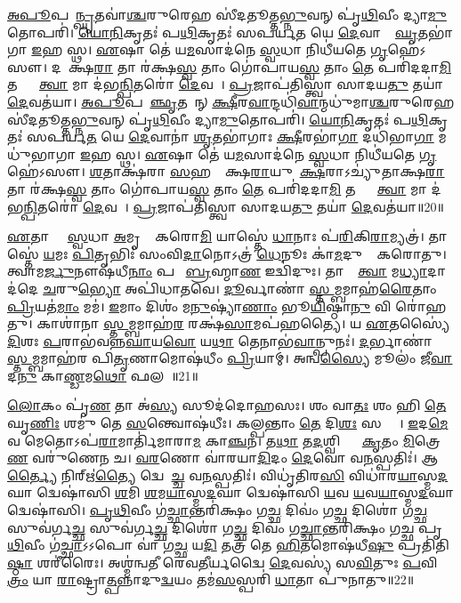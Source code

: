 \ul{𑌅}\ul{𑌪𑍂}𑌪𑌵𑌾᳚\ul{𑌨𑍍𑌘𑍃}𑌤𑌵𑌾॑\ul{𑌶𑍍𑌚}𑌰𑍁𑌰𑍇𑌹 𑌸𑍀॑𑌦𑌤𑍂𑌤𑍍𑌤\ul{𑌭𑍍𑌨𑍁}𑌵𑌨𑍍 𑌪𑍃॑\ul{𑌥𑌿}𑌵𑍀𑌂 𑌦𑍍𑌯𑌾\ul{𑌮𑍁}𑌤𑍋𑌪𑌰𑌿॑। 
\ul{𑌯𑍋}\ul{𑌨𑌿}𑌕𑍃𑌤𑌃॑ 𑌪\ul{𑌥𑌿}𑌕𑍃𑌤𑌃॑ 𑌸𑌪𑌰𑍍𑌯\ul{𑌤} 𑌯𑍇 \ul{𑌦𑍇}𑌵𑌾𑌨𑌾𑌂᳚ \ul{𑌘𑍃}𑌤𑌭𑌾॑𑌗𑌾 \ul{𑌇}𑌹 𑌸𑍍𑌥। 
\ul{𑌏}𑌷𑌾 𑌤𑍇॑ 𑌯\ul{𑌮}𑌸𑌾𑌦॑𑌨𑍇 \ul{𑌸𑍍𑌵}𑌧𑌾 𑌨𑌿𑌧𑍀॑𑌯𑌤𑍇 \ul{𑌗𑍃}𑌹𑍇॑𑌽𑌸𑍗। 
𑌦𑌶𑌾᳚𑌕𑍍𑌷\ul{𑌰𑌾} 𑌤𑌾 𑌰॑𑌕𑍍𑌷\ul{𑌸𑍍𑌵} 𑌤𑌾𑌂 𑌗𑍋॑𑌪𑌾𑌯\ul{𑌸𑍍𑌵} 𑌤𑌾𑌂 \ul{𑌤𑍇} 𑌪𑌰𑌿॑𑌦𑌦𑌾\ul{𑌮𑌿} 𑌤𑌸𑍍𑌯𑌾𑌂᳚ \ul{𑌤𑍍𑌵𑌾} 𑌮𑌾 𑌦॑𑌭\ul{𑌨𑍍𑌪𑌿}𑌤𑌰𑍋॑ \ul{𑌦𑍇}𑌵𑌤𑌾᳚। 
\ul{𑌪𑍍𑌰}𑌜𑌾𑌪॑𑌤𑌿𑌸𑍍𑌤𑍍𑌵𑌾 𑌸𑌾𑌦𑌯\ul{𑌤𑍁} 𑌤𑌯𑌾॑ \ul{𑌦𑍇}𑌵𑌤॑𑌯𑌾। 
\ul{𑌅}\ul{𑌪𑍂}𑌪𑌵𑌾᳚\ul{𑌞𑍍𑌛𑍃}𑌤𑌵𑌾᳚𑌨𑍍 \ul{𑌕𑍍𑌷𑍀}𑌰\ul{𑌵𑌾}𑌨𑍍𑌦𑌧𑌿॑\ul{𑌵𑌾}𑌨𑍍𑌮𑌧𑍁॑𑌮𑌾\ul{𑌶𑍍𑌚}𑌰𑍁𑌰𑍇𑌹 𑌸𑍀॑𑌦𑌤𑍂𑌤𑍍𑌤\ul{𑌭𑍍𑌨𑍁}𑌵𑌨𑍍 𑌪𑍃॑\ul{𑌥𑌿}𑌵𑍀𑌂 𑌦𑍍𑌯𑌾\ul{𑌮𑍁}𑌤𑍋𑌪𑌰𑌿॑। 
\ul{𑌯𑍋}\ul{𑌨𑌿}𑌕𑍃𑌤𑌃॑ 𑌪\ul{𑌥𑌿}𑌕𑍃𑌤𑌃॑ 𑌸𑌪𑌰𑍍𑌯\ul{𑌤} 𑌯𑍇 \ul{𑌦𑍇}𑌵𑌾𑌨𑌾॑ \ul{𑌶𑍃}𑌤𑌭𑌾॑𑌗𑌾𑌃 \ul{𑌕𑍍𑌷𑍀}𑌰𑌭𑌾॑\ul{𑌗𑌾} 𑌦𑌧𑌿॑𑌭𑌾\ul{𑌗𑌾} 𑌮𑌧𑍁॑𑌭𑌾𑌗𑌾 \ul{𑌇}𑌹 𑌸𑍍𑌥। 
\ul{𑌏}𑌷𑌾 𑌤𑍇॑ 𑌯\ul{𑌮}𑌸𑌾𑌦॑𑌨𑍇 \ul{𑌸𑍍𑌵}𑌧𑌾 𑌨𑌿𑌧𑍀॑𑌯𑌤𑍇 \ul{𑌗𑍃}𑌹𑍇॑𑌽𑌸𑍗। 
\ul{𑌶}𑌤𑌾𑌕𑍍𑌷॑𑌰𑌾 \ul{𑌸}𑌹𑌸𑍍𑌰𑌾᳚𑌕𑍍𑌷\ul{𑌰𑌾}𑌯𑍁𑌤𑌾᳚\ul{𑌕𑍍𑌷}𑌰𑌾𑌽𑌚𑍍𑌯𑍁॑𑌤𑌾𑌕𑍍𑌷\ul{𑌰𑌾} 𑌤𑌾 𑌰॑𑌕𑍍𑌷\ul{𑌸𑍍𑌵} 𑌤𑌾𑌂 𑌗𑍋॑𑌪𑌾𑌯\ul{𑌸𑍍𑌵} 𑌤𑌾𑌂 \ul{𑌤𑍇} 𑌪𑌰𑌿॑𑌦𑌦𑌾\ul{𑌮𑌿} 𑌤𑌸𑍍𑌯𑌾𑌂᳚ \ul{𑌤𑍍𑌵𑌾} 𑌮𑌾 𑌦॑𑌭\ul{𑌨𑍍𑌪𑌿}𑌤𑌰𑍋॑ \ul{𑌦𑍇}𑌵𑌤𑌾᳚। 
\ul{𑌪𑍍𑌰}𑌜𑌾𑌪॑𑌤𑌿𑌸𑍍𑌤𑍍𑌵𑌾 𑌸𑌾𑌦𑌯\ul{𑌤𑍁} 𑌤𑌯𑌾॑ \ul{𑌦𑍇}𑌵𑌤॑𑌯𑌾॥20॥
\anuvakamend[𑌅𑌨॑𑌪𑌸𑍍𑌫𑍁𑌰\ul{𑌨𑍍𑌤𑍀}𑌰𑍁𑌤𑍍𑌤॑𑌰 \ul{𑌦𑍇}𑌵𑌤॑\ul{𑌯𑌾} 𑌦𑍍𑌵𑍇 𑌚॑]

\ul{𑌏}𑌤𑌾𑌸𑍍𑌤𑍇᳚ \ul{𑌸𑍍𑌵}𑌧𑌾 \ul{𑌅}𑌮𑍃𑌤𑌾𑌃᳚ 𑌕𑌰𑍋\ul{𑌮𑌿} 𑌯𑌾𑌸𑍍𑌤𑍇॑ \ul{𑌧𑌾}𑌨𑌾𑌃 𑌪॑\ul{𑌰𑌿}𑌕𑌿\ul{𑌰𑌾}𑌮𑍍𑌯𑌤𑍍𑌰॑। 
𑌤𑌾𑌸𑍍𑌤𑍇॑ \ul{𑌯}𑌮𑌃 \ul{𑌪𑌿}𑌤𑍃𑌭𑌿𑌃॑ 𑌸𑌂𑌵𑌿\ul{𑌦𑌾}𑌨𑍋𑌽𑌤𑍍𑌰॑ \ul{𑌧𑍇}𑌨𑍂𑌃 𑌕𑌾॑\ul{𑌮}𑌦𑍁𑌘𑌾𑌃᳚ 𑌕𑌰𑍋𑌤𑍁। 
𑌤𑍍𑌵𑌾𑌮\ul{𑌰𑍍𑌜𑍁}𑌨𑍗𑌷॑𑌧𑍀\ul{𑌨𑌾𑌂} 𑌪𑌯𑍋᳚ \ul{𑌬𑍍𑌰}𑌹𑍍𑌮𑌾\ul{𑌣} 𑌇𑌦𑍍𑌵𑌿॑𑌦𑍁𑌃। 
𑌤𑌾𑌸𑌾𑌂᳚ \ul{𑌤𑍍𑌵𑌾} 𑌮\ul{𑌧𑍍𑌯𑌾}𑌦𑌾𑌦॑𑌦𑍇 \ul{𑌚}𑌰𑍁\ul{𑌭𑍍𑌯𑍋} 𑌅𑌪𑌿॑𑌧𑌾𑌤𑌵𑍇। 
\ul{𑌦𑍂}𑌰𑍍𑌵𑌾𑌣𑌾॑ \ul{𑌸𑍍𑌤}𑌮𑍍𑌬𑌮𑌾𑌹॑\ul{𑌰𑍈}𑌤𑌾𑌂 \ul{𑌪𑍍𑌰𑌿}𑌯𑌤॑\ul{𑌮𑌾𑌂} 𑌮𑌮॑। 
\ul{𑌇}𑌮𑌾𑌂 𑌦𑌿𑌶𑌂॑ 𑌮\ul{𑌨𑍁}𑌷𑍍𑌯𑌾॑\ul{𑌣𑌾𑌂} 𑌭𑍂\ul{𑌯𑌿}𑌷𑍍𑌠𑌾\ul{𑌨𑍁} 𑌵𑌿 𑌰𑍋॑𑌹𑌤𑍁। 
𑌕𑌾𑌶𑌾॑𑌨𑌾 \ul{𑌸𑍍𑌤}𑌮𑍍𑌬𑌮𑌾𑌹॑\ul{𑌰} 𑌰𑌕𑍍𑌷॑\ul{𑌸𑌾}𑌮𑌪॑𑌹𑌤𑍍𑌯𑍈। 
𑌯 \ul{𑌏}𑌤𑌸𑍍𑌯𑍈॑ \ul{𑌦𑌿}𑌶𑌃 \ul{𑌪}𑌰𑌾𑌭॑𑌵𑌨𑍍𑌨\ul{𑌘𑌾}𑌯\ul{𑌵𑍋} 𑌯\ul{𑌥𑌾} 𑌤𑍇𑌨𑌾𑌭॑\ul{𑌵𑌾}𑌨𑍍𑌪𑍁𑌨𑌃॑। 
\ul{𑌦}𑌰𑍍𑌭𑌾𑌣𑌾॑ \ul{𑌸𑍍𑌤}𑌮𑍍𑌬𑌮𑌾𑌹॑𑌰 𑌪𑌿\ul{𑌤𑍃}𑌣𑌾𑌮𑍋𑌷॑𑌧𑍀𑌂 \ul{𑌪𑍍𑌰𑌿}𑌯𑌾𑌮𑍍। 
𑌅𑌨𑍍𑌵\ul{𑌸𑍍𑌯𑍈} 𑌮𑍂𑌲𑌂॑ 𑌜𑍀\ul{𑌵𑌾}𑌦\ul{𑌨𑍁} 𑌕𑌾\ul{𑌣𑍍𑌡}𑌮\ul{𑌥𑍋} 𑌫𑌲𑌮𑍍᳚॥21॥

\ul{𑌲𑍋}𑌕𑌂 𑌪𑍃॑\ul{𑌣} 𑌤𑌾 𑌅॑\ul{𑌸𑍍𑌯} 𑌸𑍂𑌦॑𑌦𑍋𑌹𑌸𑌃। 
𑌶𑌂 𑌵𑌾\ul{𑌤𑌃} 𑌶𑌂 𑌹𑌿 \ul{𑌤𑍇} 𑌘𑍃\ul{𑌣𑌿𑌃} 𑌶𑌮𑍁॑ 𑌤𑍇 \ul{𑌸}𑌨𑍍𑌤𑍍𑌵𑍋𑌷॑𑌧𑍀𑌃। 
𑌕𑌲𑍍𑌪𑌨𑍍𑌤𑌾𑌂 \ul{𑌤𑍇} 𑌦𑌿\ul{𑌶𑌃} 𑌸𑌰𑍍𑌵𑌾𑌃᳚। 
\ul{𑌇}𑌦\ul{𑌮𑍇}𑌵 𑌮𑍇𑌤𑍋𑌽𑌪॑\ul{𑌰𑌾}𑌮𑌾𑌰𑍍𑌤𑌿॑𑌮𑌾𑌰𑌾\ul{𑌮} 𑌕𑌾\ul{𑌞𑍍𑌚}𑌨। 
𑌤\ul{𑌥𑌾} 𑌤\ul{𑌦}𑌶𑍍𑌵𑌿𑌭𑍍𑌯𑌾𑌂᳚ \ul{𑌕𑍃}𑌤𑌂 \ul{𑌮𑌿}𑌤𑍍𑌰𑍇\ul{𑌣} 𑌵𑌰𑍁॑𑌣𑍇𑌨 𑌚। 
\ul{𑌵}\ul{𑌰}𑌣𑍋 𑌵𑌾॑𑌰𑌯𑌾\ul{𑌦𑌿}𑌦𑌂 \ul{𑌦𑍇}𑌵𑍋 𑌵\ul{𑌨}𑌸𑍍𑌪𑌤𑌿𑌃॑। 
𑌆\ul{𑌰𑍍𑌤𑍍𑌯𑍈} 𑌨𑌿𑌰𑍍\mbox{}𑌋॑\ul{𑌤𑍍𑌯𑍈} 𑌦𑍍𑌵𑍇𑌷𑌾᳚\ul{𑌚𑍍𑌚} 𑌵\ul{𑌨}𑌸𑍍𑌪𑌤𑌿𑌃॑। 
𑌵𑌿𑌧𑍃॑𑌤𑌿𑌰\ul{𑌸𑌿} 𑌵𑌿𑌧𑌾॑𑌰\ul{𑌯𑌾}𑌸𑍍𑌮\ul{𑌦}𑌘𑌾 𑌦𑍍𑌵𑍇𑌷𑌾॑𑌸𑌿 \ul{𑌶}𑌮𑌿 \ul{𑌶}𑌮\ul{𑌯𑌾}𑌸𑍍𑌮\ul{𑌦}𑌘𑌾 𑌦𑍍𑌵𑍇𑌷𑌾॑𑌸𑌿 \ul{𑌯}𑌵 \ul{𑌯}𑌵\ul{𑌯𑌾}𑌸𑍍𑌮\ul{𑌦}𑌘𑌾 𑌦𑍍𑌵𑍇𑌷𑌾॑𑌸𑌿। 
\ul{𑌪𑍃}\ul{𑌥𑌿}𑌵𑍀𑌂 𑌗॑\ul{𑌚𑍍𑌛𑌾}𑌨𑍍𑌤𑌰𑌿॑𑌕𑍍𑌷𑌂 𑌗\ul{𑌚𑍍𑌛} 𑌦𑌿𑌵𑌂॑ 𑌗\ul{𑌚𑍍𑌛} 𑌦𑌿𑌶𑍋॑ 𑌗\ul{𑌚𑍍𑌛} 𑌸𑍁𑌵॑𑌰𑍍𑌗\ul{𑌚𑍍𑌛} 𑌸𑍁𑌵॑𑌰𑍍𑌗\ul{𑌚𑍍𑌛} 𑌦𑌿𑌶𑍋॑ 𑌗\ul{𑌚𑍍𑌛} 𑌦𑌿𑌵𑌂॑ 𑌗\ul{𑌚𑍍𑌛𑌾}𑌨𑍍𑌤𑌰𑌿॑𑌕𑍍𑌷𑌂 𑌗𑌚𑍍𑌛 𑌪𑍃\ul{𑌥𑌿}𑌵𑍀𑌂 𑌗॑\ul{𑌚𑍍𑌛𑌾}𑌽𑌽𑌪𑍋 𑌵𑌾॑ 𑌗\ul{𑌚𑍍𑌛} 𑌯\ul{𑌦𑌿} 𑌤𑌤𑍍𑌰॑ 𑌤𑍇 \ul{𑌹𑌿}𑌤𑌮𑍋𑌷॑𑌧𑍀\ul{𑌷𑍁} 𑌪𑍍𑌰𑌤𑌿॑𑌤𑌿\ul{𑌷𑍍𑌠𑌾} 𑌶𑌰𑍀॑𑌰𑍈𑌃। 
𑌅𑌶𑍍𑌮॑𑌨𑍍𑌵𑌤𑍀 𑌰𑍇𑌵\ul{𑌤𑍀}𑌰𑍍𑌯𑌦𑍍𑌵𑍈 \ul{𑌦𑍇}𑌵𑌸𑍍𑌯॑ 𑌸\ul{𑌵𑌿}𑌤𑍁𑌃 \ul{𑌪}𑌵𑌿\ul{𑌤𑍍𑌰𑌂} 𑌯𑌾 \ul{𑌰𑌾}𑌷𑍍𑌟𑍍𑌰𑌾\ul{𑌤𑍍𑌪}𑌨𑍍𑌨𑌾𑌦𑍁\ul{𑌦𑍍𑌵}𑌯𑌂 𑌤𑌮॑\ul{𑌸}𑌸𑍍𑌪𑌰𑌿॑ \ul{𑌧𑌾}𑌤𑌾 𑌪𑍁॑𑌨𑌾𑌤𑍁॥22॥
\anuvakamend[𑌫𑌲𑌂॑ 𑌪𑍁𑌨𑌾𑌤𑍁]

